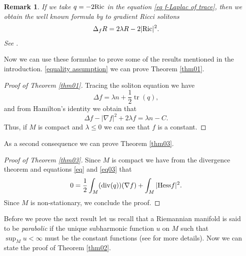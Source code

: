 \documentclass{amsart}
\theoremstyle{plain}
\newtheorem{remark}[theorem]{Remark}
\numberwithin{equation}{section}
\begin{document}
\begin{remark}
    If we take $q=-2{\rm Ric}$ in the equation \eqref{eq f-Laplac of trace}, then we obtain the well known formula by to gradient Ricci solitons
    $$\Delta_fR=2\lambda R-2|{\rm Ric}|^2.$$ See \cite{WP}.
    \end{remark}

Now we can use these formulae to prove some of the results mentioned in the introduction. 
\eqref{equality assumption} we can prove Theorem \ref{thm01}. 
\begin{proof}[Proof of Theorem \ref{thm01}]
Tracing the soliton equation we have
    $$\Delta f=\lambda n+\frac{1}{2}\operatorname{tr}(q),$$
    and from Hamilton's identity we obtain that
    \begin{equation}
        \Delta f-|\nabla f|^2+2\lambda f=\lambda n-C.
    \end{equation}
    Thus, if $M$ is compact and $\lambda\leq0$ we can see that $f$ is a constant. 
\end{proof}

As a second consequence we can prove Theorem \ref{thm03}.
\begin{proof}[Proof of Theorem \ref{thm03}]
   Since $M$ is compact we have from the divergence theorem and equations \eqref{eq} and \eqref{eq03} that
$$0=\frac{1}{2}\int_M(\mathrm{div}(q))(\nabla f)+\int_M|{\rm Hess}f|^2.$$
Since $M$ is non-stationary, we conclude the proof.
\end{proof}

Before we prove the next result let us recall that a Riemannian manifold is said to be  {\em parabolic} if the unique subharmonic function $u$ on $M$ such that $\sup_Mu<\infty$ must be the constant functions (see \cite{grigoryan} for more details).  Now we can state the proof of Theorem \ref{thm02}. 
\end{document}
